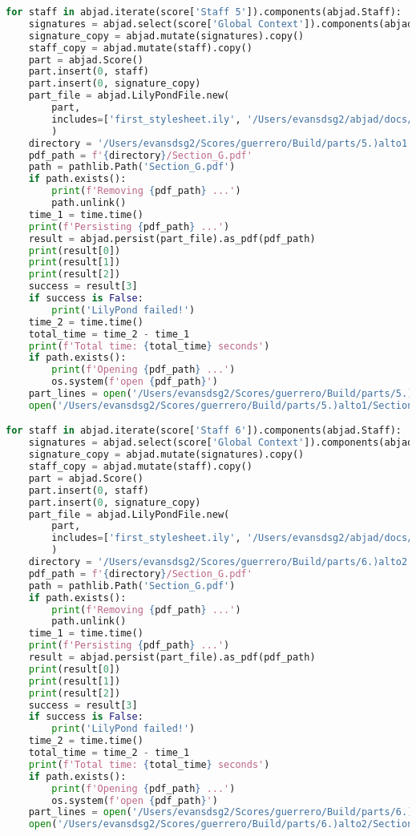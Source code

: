 \begin{lstlisting}[language=Python, caption=Invocation Source Code]
for staff in abjad.iterate(score['Staff 5']).components(abjad.Staff):
    signatures = abjad.select(score['Global Context']).components(abjad.Staff)
    signature_copy = abjad.mutate(signatures).copy()
    staff_copy = abjad.mutate(staff).copy()
    part = abjad.Score()
    part.insert(0, staff)
    part.insert(0, signature_copy)
    part_file = abjad.LilyPondFile.new(
        part,
        includes=['first_stylesheet.ily', '/Users/evansdsg2/abjad/docs/source/_stylesheets/abjad.ily'],
        )
    directory = '/Users/evansdsg2/Scores/guerrero/Build/parts/5.)alto1'
    pdf_path = f'{directory}/Section_G.pdf'
    path = pathlib.Path('Section_G.pdf')
    if path.exists():
        print(f'Removing {pdf_path} ...')
        path.unlink()
    time_1 = time.time()
    print(f'Persisting {pdf_path} ...')
    result = abjad.persist(part_file).as_pdf(pdf_path)
    print(result[0])
    print(result[1])
    print(result[2])
    success = result[3]
    if success is False:
        print('LilyPond failed!')
    time_2 = time.time()
    total_time = time_2 - time_1
    print(f'Total time: {total_time} seconds')
    if path.exists():
        print(f'Opening {pdf_path} ...')
        os.system(f'open {pdf_path}')
    part_lines = open('/Users/evansdsg2/Scores/guerrero/Build/parts/5.)alto1/Section_G.ly').readlines()
    open('/Users/evansdsg2/Scores/guerrero/Build/parts/5.)alto1/Section_G.ly', 'w').writelines(part_lines[15:-1])

for staff in abjad.iterate(score['Staff 6']).components(abjad.Staff):
    signatures = abjad.select(score['Global Context']).components(abjad.Staff)
    signature_copy = abjad.mutate(signatures).copy()
    staff_copy = abjad.mutate(staff).copy()
    part = abjad.Score()
    part.insert(0, staff)
    part.insert(0, signature_copy)
    part_file = abjad.LilyPondFile.new(
        part,
        includes=['first_stylesheet.ily', '/Users/evansdsg2/abjad/docs/source/_stylesheets/abjad.ily'],
        )
    directory = '/Users/evansdsg2/Scores/guerrero/Build/parts/6.)alto2'
    pdf_path = f'{directory}/Section_G.pdf'
    path = pathlib.Path('Section_G.pdf')
    if path.exists():
        print(f'Removing {pdf_path} ...')
        path.unlink()
    time_1 = time.time()
    print(f'Persisting {pdf_path} ...')
    result = abjad.persist(part_file).as_pdf(pdf_path)
    print(result[0])
    print(result[1])
    print(result[2])
    success = result[3]
    if success is False:
        print('LilyPond failed!')
    time_2 = time.time()
    total_time = time_2 - time_1
    print(f'Total time: {total_time} seconds')
    if path.exists():
        print(f'Opening {pdf_path} ...')
        os.system(f'open {pdf_path}')
    part_lines = open('/Users/evansdsg2/Scores/guerrero/Build/parts/6.)alto2/Section_G.ly').readlines()
    open('/Users/evansdsg2/Scores/guerrero/Build/parts/6.)alto2/Section_G.ly', 'w').writelines(part_lines[15:-1])


\end{lstlisting}
